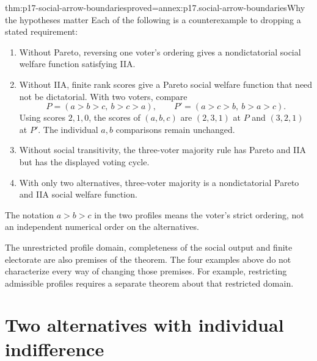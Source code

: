 \begin{hbtheorem}{thm:p17-social-arrow-boundaries}{proved=annex:p17.social-arrow-boundaries}{Why the hypotheses matter}
Each of the following is a counterexample to dropping a stated requirement:
\begin{enumerate}
\item Without Pareto, reversing one voter's ordering gives a nondictatorial
      social welfare function satisfying IIA.
\item Without IIA, finite rank scores give a Pareto social welfare function
      that need not be dictatorial. With two voters, compare
      \[
       P=(a>b>c,\ b>c>a),\qquad
       P'=(a>c>b,\ b>a>c).
      \]
      Using scores \(2,1,0\), the scores of \((a,b,c)\) are
      \((2,3,1)\) at \(P\) and \((3,2,1)\) at \(P'\).
      The individual \(a,b\) comparisons remain unchanged.
\item Without social transitivity, the three-voter majority rule has
      Pareto and IIA but has the displayed voting cycle.
\item With only two alternatives, three-voter majority is a nondictatorial
      Pareto and IIA social welfare function.
\end{enumerate}
The notation \(a>b>c\) in the two profiles means the voter's strict
ordering, not an independent numerical order on the alternatives.
\end{hbtheorem}

The unrestricted profile domain, completeness of the social output and
finite electorate are also premises of the theorem. The four examples
above do not characterize every way of changing those premises.
For example, restricting admissible profiles requires a separate theorem
about that restricted domain.

\section{Two alternatives with individual indifference}
\label{sec:p17-binary-majority-characterization}

